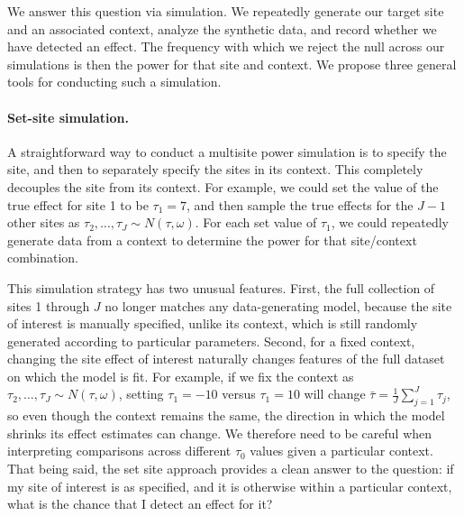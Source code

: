 \documentclass[]{article}
\begin{document}
We answer this question via simulation.
We repeatedly generate our target site and an associated context, analyze the synthetic data, and record whether we have detected an effect.
The frequency with which we reject the null across our simulations is then the power for that site and context.
We propose three general tools for conducting such a simulation.

\paragraph{Set-site simulation.} A straightforward way to conduct a multisite power simulation is to specify the site, and then to separately specify the sites in its context.
This completely decouples the site from its context.
For example, we could set the value of the true effect for site 1 to be $\tau_1 = 7$, and then sample the true effects for the $J-1$ other sites as $\tau_2, \dots, \tau_J \sim N(\tau, \omega)$.
For each set value of $\tau_1$, we could repeatedly generate data from a context to determine the power for that site/context combination.

This simulation strategy has two unusual features.
First, the full collection of sites 1 through $J$ no longer matches any data-generating model, because the site of interest is manually specified, unlike its context, which is still randomly generated according to particular parameters.
Second, for a fixed context, changing the site effect of interest naturally changes features of the full dataset on which the model is fit.
For example, if we fix the context as $\tau_2, \dots, \tau_J \sim N(\tau, \omega)$, setting $\tau_1 = -10$ versus $\tau_1 = 10$ will change $\bar{\tau} = \frac{1}{J} \sum_{j=1}^{J} \tau_j$, so even though the context remains the same, the direction in which the model shrinks its effect estimates can change.
We therefore need to be careful when interpreting comparisons across different $\tau_0$ values given a particular context.
That being said, the set site approach provides a clean answer to the question: if my site of interest is as specified, and it is otherwise within a particular context, what is the chance that I detect an effect for it?
\end{document}
